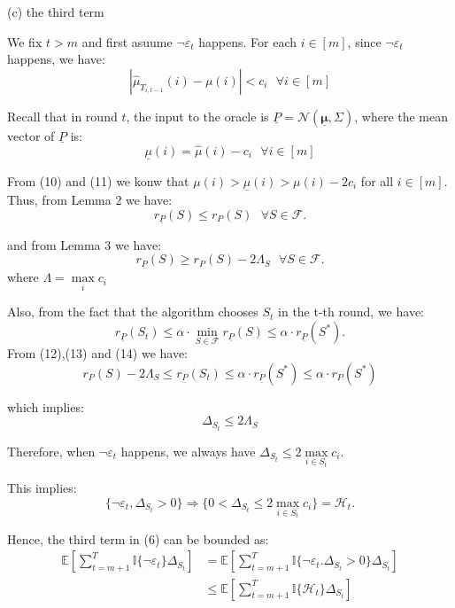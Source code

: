 \documentclass[opre,sglanonrev]{informs4}
\begin{document}
(c) the third term 

We fix $t>m$ and first asuume $\lnot \varepsilon_t$ happens. For each $i \in [m]$, since $\lnot \varepsilon_t$ happens, we have:
\begin{equation}
	|\hat{\mu}_{T_{i,t-1}}(i)-\mu(i)| < c_i ~~~ \forall i \in [m]
\end{equation}

Recall that in round $t$, the input to the oracle is $\underline{P} = \mathcal{N}(\underline{\boldsymbol{\mu}},\Sigma)$, where the mean vector of $\underline{P}$ is:
\begin{equation}
	\underline{\mu}(i) = \hat{\mu}(i)-c_i ~~~ \forall i \in [m]
\end{equation}

From (10) and (11) we  konw that $\mu(i)>\underline{\mu}(i)>\mu(i)-2c_i$ for all $i \in [m]$. Thus, from Lemma 2 we have:
\begin{equation}
	r_{\underline{P}}(S)\leq r_P(S) ~~~ \forall S \in \mathcal{F}.
\end{equation}

and from Lemma 3 we have:
\begin{equation}
	r_{\underline{P}}(S)\geq r_P(S)-2\Lambda_S ~~~ \forall S \in \mathcal{F}.
\end{equation}
where $\Lambda = \mathop{\max}\limits_{i}c_i$

Also, from the fact that the algorithm chooses $S_t$ in the t-th round, we have:
\begin{equation}
	r_{\underline{P}}(S_t)\leq \alpha \cdot \mathop{\min}\limits_{S \in \mathcal{F}}r_{\underline{P}}(S) \leq \alpha \cdot r_{\underline{P}}(S^*).
\end{equation}
From (12),(13) and (14) we have:
\begin{equation}
	r_P(S)-2\Lambda_S \leq r_{\underline{P}}(S_t) \leq \alpha \cdot r_{\underline{P}}(S^*) \leq \alpha \cdot r_P(S^*)
\end{equation}

which implies:
$$
	\Delta_{S_t} \leq 2\Lambda_S
$$

Therefore, when $\lnot \varepsilon_t$ happens, we always have $\Delta_{S_t}\leq 2\mathop{\max}\limits_{i\in S_t}c_i$.

This implies:
$$
	\{\lnot \varepsilon_t, \Delta_{S_t}>0\}\Longrightarrow \{0<\Delta_{S_t}\leq 2\mathop{\max}\limits_{i\in S_t}c_i\}=\mathcal{H}_t.
$$

Hence, the third term in (6) can be bounded as:
\begin{equation}
	\begin{aligned}
		\mathbb{E}[\sum_{t=m+1}^{T}\mathbb{I}\{\lnot \varepsilon_t\}\Delta_{S_t}] &= \mathbb{E}[\sum_{t=m+1}^{T}\mathbb{I}\{\lnot \varepsilon_t. \Delta_{S_t}>0\}\Delta_{S_t}]\\
		&\leq \mathbb{E}[\sum_{t=m+1}^{T}\mathbb{I}\{\mathcal{H}_t\}\Delta_{S_t}]
	\end{aligned}
\end{equation}
\end{document}
